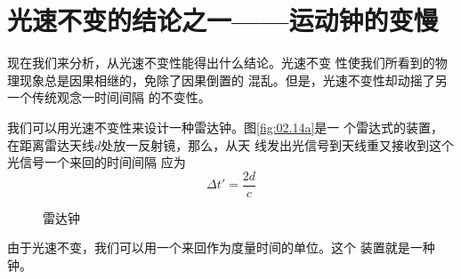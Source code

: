 \section{光速不变的结论之一——运动钟的变慢}\label{sec:02.07}

现在我们来分析，从光速不变性能得出什么结论。光速不变
性使我们所看到的物理现象总是因果相继的，免除了因果倒置的
混乱。但是，光速不变性却动摇了另一个传统观念一时间间隔
的不变性。

我们可以用光速不变性来设计一种雷达钟。图\ref{fig:02.14a}是一
个雷达式的装置，在距离雷达天线$d$处放一反射镜，那么，从天
线发出光信号到天线重又接收到这个光信号一个来回的时间间隔
应为
\begin{equation*}
  \Delta t ' = \frac { 2 d } { c }
\end{equation*}
\begin{figure}[!h]
  \centering
  \quad
  \caption{雷达钟}
  \label{fig:02.14}
\end{figure}

由于光速不变，我们可以用一个来回作为度量时间的单位。这个
装置就是一种钟。

